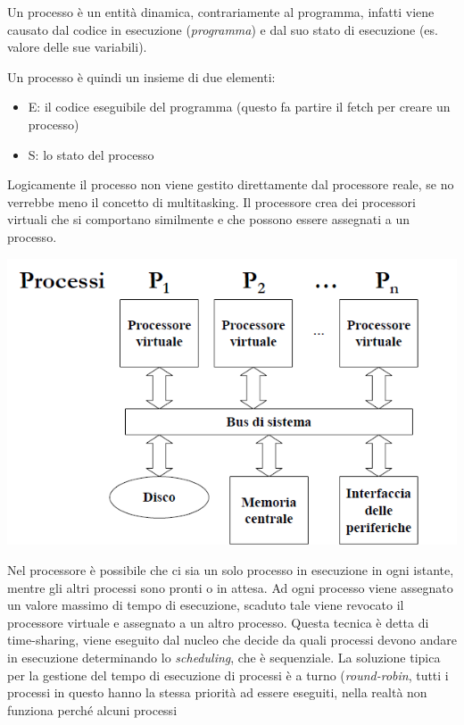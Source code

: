 \documentclass[
  paper=a4,
  oneside  ,captions=tableheading
]{scrbook}
\providecommand{\tightlist}{%
  \setlength{\itemsep}{0pt}\setlength{\parskip}{0pt}}
\begin{document}
Un processo è un entità dinamica, contrariamente al programma, infatti
viene causato dal codice in esecuzione (\emph{programma}) e dal suo
stato di esecuzione (es. valore delle sue variabili).

Un processo è quindi un insieme di due elementi:

\begin{itemize}
\tightlist
\item
  E: il codice eseguibile del programma (questo fa partire il fetch per
  creare un processo)
\item
  S: lo stato del processo
\end{itemize}

Logicamente il processo non viene gestito direttamente dal processore
reale, se no verrebbe meno il concetto di multitasking. Il processore
crea dei processori virtuali che si comportano similmente e che possono
essere assegnati a un processo.
\begin{center}
\includegraphics{./image/image-20201123234616173.png}
\end{center}
Nel processore è possibile che ci sia un solo processo in esecuzione in
ogni istante, mentre gli altri processi sono pronti o in attesa. Ad ogni
processo viene assegnato un valore massimo di tempo di esecuzione,
scaduto tale viene revocato il processore virtuale e assegnato a un
altro processo. Questa tecnica è detta di time-sharing, viene eseguito
dal nucleo che decide da quali processi devono andare in esecuzione
determinando lo \emph{scheduling}, che è sequenziale. La soluzione
tipica per la gestione del tempo di esecuzione di processi è a turno
(\emph{round-robin}, tutti i processi in questo hanno la stessa priorità
ad essere eseguiti, nella realtà non funziona perché alcuni processi
\end{document}
